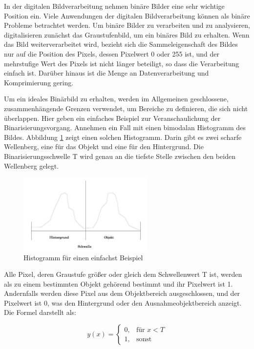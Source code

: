 In der digitalen Bildverarbeitung nehmen binäre Bilder eine sehr wichtige Position ein. Viele Anwendungen der digitalen Bildverarbeitung können als binäre Probleme betrachtet werden. Um binäre Bilder zu verarbeiten und zu analysieren, digitalisieren zunächst das Graustufenbild, um ein binäres Bild zu erhalten. Wenn das Bild weiterverarbeitet wird, bezieht sich die Sammeleigenschaft des Bildes nur auf die Position des Pixels, dessen Pixelwert 0 oder 255 ist, und der mehrstufige Wert des Pixels ist nicht länger beteiligt, so dass die Verarbeitung einfach ist. Darüber hinaus ist die Menge an Datenverarbeitung und Komprimierung gering. 

Um ein ideales Binärbild zu erhalten, werden im Allgemeinen geschlossene, zusammenhängende Grenzen verwendet, um Bereiche zu definieren, die sich nicht überlappen. Hier geben ein einfaches Beispiel zur Veranschaulichung der Binarisierungsvorgang. Annehmen ein Fall mit einen bimodalan Histogramm des Bildes. Abbildung \ref{fig:Histogramm} zeigt einen solchen Histogramm. Darin gibt es zwei scharfe Wellenberg, eine für das Objekt und eine für den Hintergrund. Die Binarisierungsschwelle T wird genau an die tiefste Stelle zwischen den beiden Wellenberg gelegt. 

\begin{figure}[htb]
 \centering 
  \includegraphics[keepaspectratio,width=0.6\textwidth]{images/4_ZweiteErfahrung/Binar/binar.pdf}
 \caption{Histogramm für einen einfachst Beispiel}
 \label{fig:Histogramm}
\end{figure} 

Alle Pixel, deren Graustufe größer oder gleich dem Schwellenwert T ist, werden als zu einem bestimmten Objekt gehörend bestimmt und ihr Pixelwert ist 1. Andernfalls werden diese Pixel aus dem Objektbereich ausgeschlossen, und der Pixelwert ist 0, was den Hintergrund oder den Ausnahmeobjektbereich anzeigt. Die Formel darstellt als:

\begin{equation}
  y(x) =
  \begin{cases} 
  0,   & \mbox{für }x < T \\
  1, & \mbox{sonst}
  \end{cases}
\end{equation}

